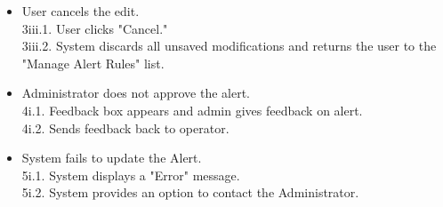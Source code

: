 \documentclass[]{article}
\begin{document}
\begin{enumerate}[{\bf BE1.}]
\begin{itemize}
			\hspace{1cm}3ii.1. System highlights the input box in red. \\
			\hspace{1cm}3ii.2. System prevents user from proceeding until the error is corrected.
			\item[3iii.] User cancels the edit. \\
			\hspace{1cm}3iii.1. User clicks "Cancel." \\
			\hspace{1cm}3iii.2. System discards all unsaved modifications and returns the user to the "Manage Alert Rules" list.
			\item[4i.] Administrator does not approve the alert. \\
			\hspace{1cm}4i.1. Feedback box appears and admin gives feedback on alert. \\
			\hspace{1cm}4i.2. Sends feedback back to operator.
			\item[5i.] System fails to update the Alert. \\
			\hspace{1cm}5i.1. System displays a "Error" message. \\
			\hspace{1cm}5i.2. System provides an option to contact the Administrator.
		\end{itemize}




\end{enumerate}
\end{document}
